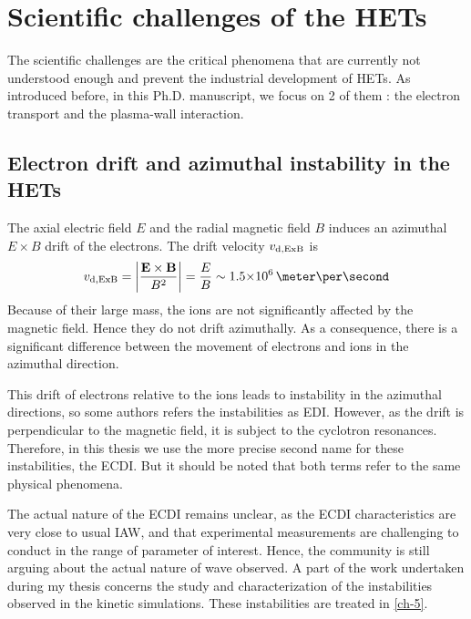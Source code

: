 
\section*{Scientific challenges of the HETs}

The scientific challenges are the critical phenomena that are currently not understood enough and prevent the industrial development of \ac{HET}s.
As introduced before, in this Ph.D. manuscript, we focus on 2 of them : the electron transport and the plasma-wall interaction.


\subsection*{Electron drift and azimuthal instability in the HETs}

The axial electric field $E$ and the radial magnetic field $B$ induces an azimuthal $E\times B$ drift of the electrons.
The drift velocity $v_{\rm d, ExB}$ is 
\begin{equation} \label{eq-exbdriftbis}
  v_{\rm d, ExB} = \bigg\lvert \frac{\vect{E} \times \vect{B}}{B^2} \bigg\rvert = \frac{E}{B} \sim \sn{1.5}{6} \,\meter\per\second
\end{equation}
Because of their large mass, the ions are not significantly affected by the magnetic field.
Hence they do not drift azimuthally.
As a consequence, there is a significant difference between the movement of electrons and ions in the azimuthal direction.

This drift of electrons relative to the ions leads to instability in the azimuthal directions, so some  authors refers the instabilities as \ac{EDI}.
However, as the drift is perpendicular to the magnetic field, it is subject to the cyclotron resonances.
Therefore, in this thesis we use the more precise second name for these instabilities, the \ac{ECDI}.
But it should be noted that both terms refer to the same physical phenomena.

The actual nature of the \ac{ECDI} remains unclear\citep{boeuf2018}, as the \ac{ECDI} characteristics are very close to usual \ac{IAW}, and that experimental measurements are challenging to conduct in the range of parameter of interest.
Hence, the community is still arguing about the actual nature of wave observed.
A part of the work undertaken during my thesis concerns the study and characterization of the instabilities observed in the kinetic simulations.
These instabilities are treated in \cref{ch-5}.


